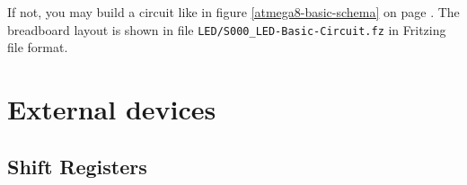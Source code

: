 \documentclass[twoside,english,12pt,authoryear,openright]{book}
\begin{document}
If not, you may build a circuit like in figure \ref{atmega8-basic-schema} on page \pageref{atmega8-basic-schema}. The breadboard layout is shown in file \texttt{LED/S000\_LED-Basic-Circuit.fz} in Fritzing file format.







\part{External devices}

\chapter{Shift Registers}


\end{document}
